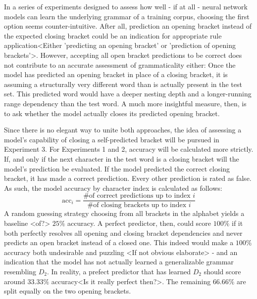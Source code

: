 In a series of experiments designed to assess how well - if at all - neural network models can learn the underlying grammar of a training corpus, choosing the first option seems counter-intuitive. After all, prediction an opening bracket instead of the expected closing bracket could be an indication for appropriate rule application<Either 'predicting an opening bracket' or 'prediction of opening brackets'>. However, accepting all open bracket predictions to be correct does not contribute to an accurate assessment of grammaticality either: Once the model has predicted an opening bracket in place of a closing bracket, it is assuming a structurally very different word than is actually present in the test set. This predicted word would have a deeper nesting depth and a longer-running range dependency than the test word. A much more insightful measure, then, is to ask whether the model actually closes its predicted opening bracket.

Since there is no elegant way to unite both approaches, the idea of assessing a model's capability of closing a self-predicted bracket will be pursued in Experiment 3. For Experiments 1 and 2, accuracy will be calculated more strictly. If, and only if the next character in the test word is a closing bracket will the model's prediction be evaluated. If the model predicted the correct closing bracket, it has made a correct prediction. Every other prediction is rated as false. As such, the model accuracy by character index is calculated as follows:
\[
	\text{acc}_{i} = \frac{\text{\# of correct predictions up to index }i}{\text{\# of closing brackets up to index }i}
\]
A random guessing strategy choosing from all brackets in the alphabet yields a baseline <of?> $25\%$ accuracy. A perfect predictor, then, could score $100\%$ if it both perfectly resolves all opening and closing bracket dependencies and never predicts an open bracket instead of a closed one.
This indeed would make a $100\%$ accuracy both undesirable and puzzling <If not obvious elaborate> - and an indication that the model has not actually learned a generalizable grammar resembling $D_{2}$. In reality, a prefect predictor that has learned $D_{2}$ should score around $33.33\%$ accuracy<Is it really perfect then?>. The remaining $66.66\%$ are split equally on the two opening brackets.

